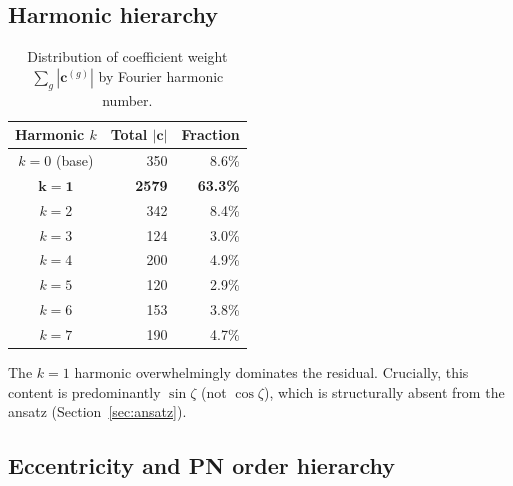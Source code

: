 \documentclass[11pt,letterpaper]{article}
\begin{document}
\subsection{Harmonic hierarchy}

\begin{table}[H]
\centering
\caption{Distribution of coefficient weight $\sum_g |\mathbf{c}^{(g)}|$ by Fourier harmonic number.}
\label{tab:harmonics}
\begin{tabular}{@{}crr@{}}
\toprule
Harmonic $k$ & Total $|\mathbf{c}|$ & Fraction \\
\midrule
$k = 0$ (base) & 350 & 8.6\% \\
$\mathbf{k = 1}$ & \textbf{2579} & \textbf{63.3\%} \\
$k = 2$ & 342 & 8.4\% \\
$k = 3$ & 124 & 3.0\% \\
$k = 4$ & 200 & 4.9\% \\
$k = 5$ & 120 & 2.9\% \\
$k = 6$ & 153 & 3.8\% \\
$k = 7$ & 190 & 4.7\% \\
\bottomrule
\end{tabular}
\end{table}

\noindent The $k = 1$ harmonic overwhelmingly dominates the residual. Crucially, this content is predominantly $\sin\zeta$ (not $\cos\zeta$), which is structurally absent from the ansatz (Section~\ref{sec:ansatz}).

\subsection{Eccentricity and PN order hierarchy}
\end{document}
